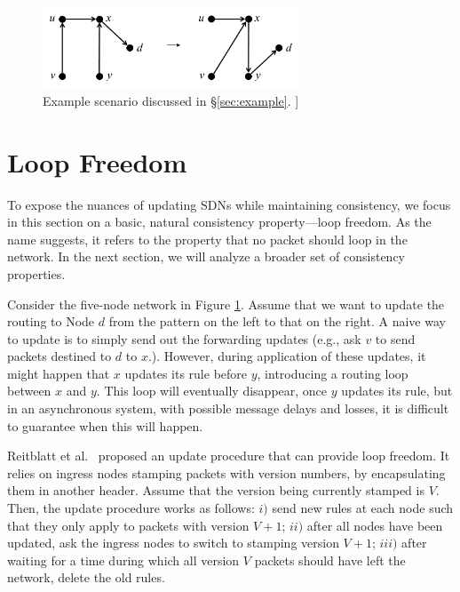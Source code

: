 
\begin{figure}[t!]
\includegraphics[width=3in]{figures/noloops.png}
\caption{Example scenario discussed in \S\ref{sec:example}. ]
}
\label{fig:example}
\end{figure}

\section{Loop Freedom}
\label{sec:loop-free}

To expose the nuances of updating SDNs while maintaining consistency, we focus in this section on a basic, natural consistency property---loop freedom. As the name suggests, it refers to the property that no packet should loop in the network.  In the next section, we will analyze a broader set of consistency properties.

Consider the five-node network in Figure \ref{fig:example}. Assume that we want to update the routing to Node $d$ from the pattern on the left to that on the right. A naive way to update is to simply send out the forwarding updates (e.g., ask $v$ to send packets destined to $d$ to $x$.). However, during application of these updates, it might happen that $x$ updates its rule before $y$, introducing a routing loop between $x$ and $y$. This loop will eventually disappear, once $y$ updates its rule, but in an asynchronous system, with possible message delays and losses, it is difficult to guarantee when this will happen.

Reitblatt et al.~\cite{safeupdates} proposed an update procedure that can provide loop freedom. It  relies on ingress nodes stamping packets with version numbers, by encapsulating them in another header. Assume that the version being currently stamped is $V.$ Then, the update procedure works as follows: $i)$ send new rules at each node such that they only apply to packets with version $V+1$; $ii)$ after all nodes have been updated, ask the ingress nodes to switch to stamping version $V+1$; $iii)$ after waiting for a time during which all version $V$ packets should have left the network,  delete the old rules.


